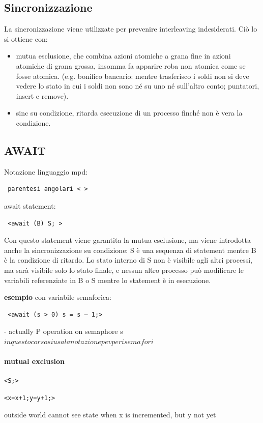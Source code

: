 \documentclass[10pt,a4paper]{article}
\begin{document}
\subsection{Sincronizzazione}
La sincronizzazione viene utilizzate per prevenire interleaving indesiderati. Ciò lo si ottiene con: 
\begin{itemize}
\item mutua esclusione, che combina azioni atomiche a grana fine in azioni atomiche di grana grossa, insomma fa apparire roba non atomica come se fosse atomica. (e.g. bonifico bancario: mentre trasferisco i soldi non si deve vedere lo stato in cui i soldi non sono né su uno né sull'altro conto; puntatori, insert e remove).
\item sinc su condizione, ritarda esecuzione di un processo finché non è vera la condizione.
\end{itemize}

\subsection{AWAIT}
Notazione linguaggio mpd: \begin{verbatim} parentesi angolari < >\end{verbatim}
await statement: \begin{verbatim} <await (B) S; >\end{verbatim}
Con questo statement viene garantita la mutua esclusione, ma viene introdotta anche la sincronizzazione su condizione: S è una sequenza di statement mentre B è la condizione di ritardo.
Lo stato interno di S non è visibile agli altri processi, ma sarà visibile solo lo stato finale, e nessun altro processo può modificare le variabili referenziate in B o S mentre lo statement è in esecuzione.

\textbf{esempio} con variabile semaforica: \begin{verbatim} <await (s > 0) s = s – 1;> \end{verbatim} 
 - actually P operation on semaphore s \\

 $ in questo corso si usa la notazione p e v per i semafori $

\paragraph{mutual exclusion} \begin{verbatim}<S;>\end{verbatim}
\begin{verbatim}<x=x+1;y=y+1;>\end{verbatim}
outside world cannot see state when x is incremented, but y not yet \\
\end{document}
